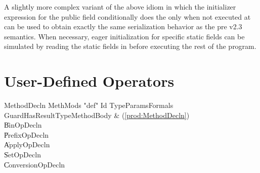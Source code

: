 A slightly more complex variant of the above idiom in which the
initializer expression for the public field conditionally does the 
only when not executed at  can be used to
obtain exactly the same serialization behavior as the pre \Xten{} v2.3
semantics.  When necessary, eager initialization for specific static fields
can be simulated by reading the static fields in  before
executing the rest of the program.

\section{User-Defined Operators}
\label{sect:operators}

\begin{bbgrammar}
         MethodDecln \: MethMods \xcd"def" Id TypeParams\opt Formals Guard\opt HasResultType\opt MethodBody & (\ref{prod:MethodDecln}) \\
                     \| BinOpDecln \\
                     \| PrefixOpDecln \\
                     \| ApplyOpDecln \\
                     \| SetOpDecln \\
                     \| ConversionOpDecln \\
\end{bbgrammar}


